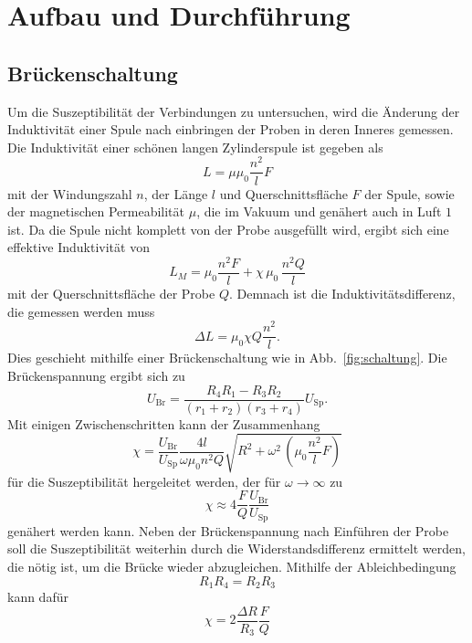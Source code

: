 \section {Aufbau und Durchführung}
\label{sec:durchführung}
\subsection{Brückenschaltung}
Um die Suszeptibilität der Verbindungen zu untersuchen, wird die Änderung der Induktivität einer Spule nach einbringen der Proben in deren Inneres gemessen. Die Induktivität einer schönen langen Zylinderspule ist gegeben als
\begin{equation}
  L = \mu \mu_0 \frac{n^2}{l} F
\end{equation}
mit der Windungszahl $n$, der Länge $l$ und Querschnittsfläche $F$ der Spule, sowie der magnetischen Permeabilität $\mu$, die im Vakuum und genähert auch in Luft $1$ ist. Da die Spule nicht komplett von der Probe ausgefüllt wird, ergibt sich eine effektive Induktivität von
\begin{equation}
  L_M = \mu_0 \frac{n^2 F}{l} + \chi \, \mu_0 \, \frac{n^2 Q}{l}
\end{equation}
mit der Querschnittsfläche der Probe $Q$. Demnach ist die Induktivitätsdifferenz, die gemessen werden muss
\begin{equation}
  \Delta L = \mu_0 \chi Q \frac{n^2}{l}.
\end{equation}
Dies geschieht mithilfe einer Brückenschaltung wie in Abb.~\ref{fig:schaltung}.
Die Brückenspannung ergibt sich zu
\begin{equation}
  U_\text{Br} = \frac{R_4 R_1 - R_3 R_2}{(r_1+r_2)(r_3+r_4)} U_\text{Sp}.
\end{equation}
Mit einigen Zwischenschritten kann der Zusammenhang
\begin{equation}
  \chi = \frac{U_\text{Br}}{U_\text{Sp}} \frac{4l}{\omega \mu_0 n^2 Q} \sqrt{R^2 + \omega^2 \, \left(\mu_0 \frac{n^2}{l} F\right)}
\end{equation}
für die Suszeptibilität hergeleitet werden, der für $\omega \rightarrow \infty$ zu
\begin{equation}
  \label{eqn:chi2}
  \chi \approx 4 \frac{F}{Q}\frac{U_\text{Br}}{U_\text{Sp}}
\end{equation}
genähert werden kann.
Neben der Brückenspannung nach Einführen der Probe soll die Suszeptibilität weiterhin durch die Widerstandsdifferenz ermittelt werden, die nötig ist, um die Brücke wieder abzugleichen. Mithilfe der Ableichbedingung
\begin{equation}
  R_1 R_4 = R_2 R_3
\end{equation}
kann dafür
\begin{equation}
  \label{eqn:chi3}
  \chi = 2 \frac{\Delta R}{R_3} \frac{F}{Q}
\end{equation}

